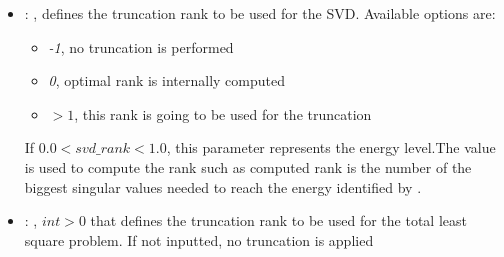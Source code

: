 \begin{itemize}
\begin{itemize}
        \item {}: ,
          GPR restart parameter. The number of restarts of the optimizer for finding the
          kernel parameters which maximize the log-marginal likelihood. The first run of the
          optimizer                                                  is performed from the kernel’s
          initial parameters, the remaining ones (if any) from thetas
          sampled log-uniform randomly from the space of allowed theta-values. If greater than 0,
          all bounds must be finite. Note that $n\_restarts\_optimizer == 0$ implies that one run is
          performed.

        \item {}: ,
          GPR normalization. Whether or not to normalize the target values y by removing the mean
          and scaling                                                  to unit-variance. This is
          recommended for cases where zero-mean, unit-variance priors are used.
          Note that, in this implementation, the normalisation is reversed before the GP predictions
          are reported.
      \end{itemize}

    \item {}: ,
      defines the truncation rank to be used for the SVD.
      Available options are:                                                  \begin{itemize}
      \item \textit{-1}, no truncation is performed
      \item \textit{0}, optimal rank is internally computed
      \item \textit{$>1$}, this rank is going to be used for the truncation
      \end{itemize}                                                  If $0.0 < svd\_rank < 1.0$, this
      parameter represents the energy level.The value is used to compute the rank such
      as computed rank is the number of the biggest singular values needed to reach the energy
      identified by                                                    .

    \item {}: ,
      $int > 0$ that defines the truncation rank to be used for the total
      least square problem. If not inputted, no truncation is applied


\end{itemize}
